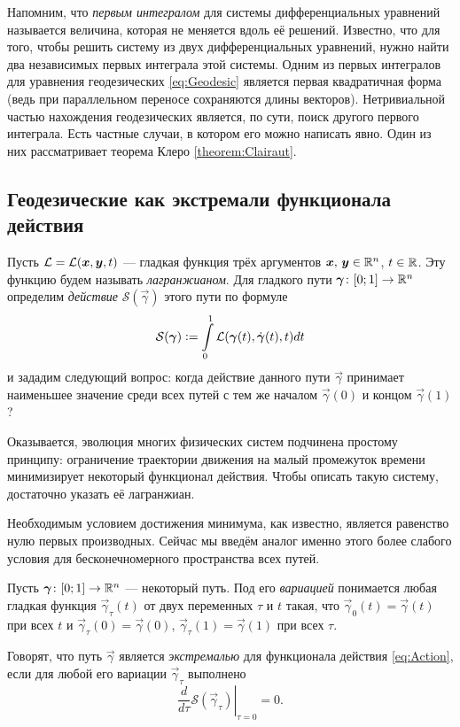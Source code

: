 Напомним, что \textit{первым интегралом} для системы дифференциальных уравнений называется величина, которая не меняется вдоль её решений. Известно, что для того, чтобы решить систему из двух дифференциальных уравнений, нужно найти два независимых первых интеграла этой системы. Одним из первых интегралов для уравнения геодезических \eqref{eq:Geodesic} является первая квадратичная форма (ведь при параллельном переносе сохраняются длины векторов). Нетривиальной частью нахождения геодезических является, по сути, поиск другого первого интеграла. Есть частные случаи, в котором его можно написать явно. Один из них рассматривает теорема Клеро \ref{theorem:Clairaut}.

\subsection{Геодезические как экстремали функционала действия}

Пусть $\mathcal{L} = \mathcal{L}(\boldsymbol{x}, \boldsymbol{y}, t)$ --- гладкая функция трёх аргументов $\boldsymbol{x},\,\boldsymbol{y} \in \mathbb{R}^n$, $t \in \mathbb{R}$. Эту функцию будем называть \textit{лагранжианом}. Для гладкого пути $\boldsymbol{\gamma}\colon [0; 1] \to \mathbb{R}^n$ определим \textit{действие} $\mathcal{S}(\vec{\gamma})$ этого пути по формуле
\begin{equation} \label{eq:Action}
	\mathcal{S}(\boldsymbol{\gamma}) \vcentcolon = \int\limits_0^1\mathcal{L}(\boldsymbol{\gamma}(t), \dot{\boldsymbol{\gamma}}(t), t)dt
\end{equation}
и зададим следующий вопрос: когда действие данного пути $\vec{\gamma}$ принимает наименьшее значение среди всех путей с тем же началом $\vec{\gamma}(0)$ и концом $\vec{\gamma}(1)$?

Оказывается, эволюция многих физических систем подчинена простому принципу: ограничение траектории движения на малый промежуток времени минимизирует некоторый функционал действия\footnotemark{}. Чтобы описать такую систему, достаточно указать её лагранжиан.


Необходимым условием достижения минимума, как известно, является равенство нулю первых производных. Сейчас мы введём аналог именно этого более слабого условия для бесконечномерного пространства всех путей.

\begin{definition}
	Пусть $\boldsymbol{\gamma}\colon [0; 1] \to \mathbb{R}^n$ --- некоторый путь. Под его \textit{вариацией} понимается любая гладкая функция $\vec{\gamma}_\tau(t)$ от двух переменных $\tau$ и $t$ такая, что $\vec{\gamma}_0(t) = \vec{\gamma}(t)$ при всех $t$ и $\vec{\gamma}_\tau(0) = \vec{\gamma}(0)$, $\vec{\gamma}_\tau(1) = \vec{\gamma}(1)$ при всех $\tau$.

	Говорят, что путь $\vec{\gamma}$ является \textit{экстремалью} для функционала действия \eqref{eq:Action}, если для любой его вариации $\vec{\gamma}_\tau$ выполнено
	\[
		\left.\frac{d}{d\tau}\mathcal{S}(\vec{\gamma}_\tau)\right|_{\tau = 0} = 0.
	\]
\end{definition}

